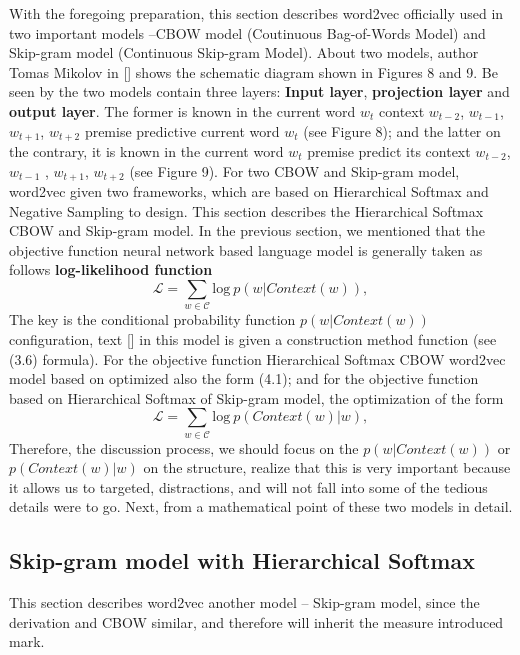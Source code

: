 With the foregoing preparation, this section describes word2vec officially used in two important models --CBOW model (Coutinuous Bag-of-Words Model) and Skip-gram model (Continuous Skip-gram Model). About two models, author Tomas Mikolov in [] shows the schematic diagram shown in Figures 8 and 9.
Be seen by the two models contain three layers: \textbf{Input layer}, \textbf{projection layer}  and \textbf{output layer}. The former is known in the current word $w_t$ context $w_{t-2}$, $w_{t-1}$, $w_{t+1}$, $w_{t+2}$ premise predictive current word $w_t$ (see Figure 8); and the latter on the contrary, it is known in the current word $w_t$ premise predict its context $w_{t-2}$, $w_{t-1}$ , $w_{t+1}$, $w_{t+2}$ (see Figure 9).
For two CBOW and Skip-gram model, word2vec given two frameworks, which are based on Hierarchical Softmax and Negative Sampling to design. This section describes the Hierarchical Softmax CBOW and Skip-gram model.
In the previous section, we mentioned that the objective function neural network based language model is generally taken as follows \textbf{log-likelihood function}
$$\mathcal{L}=\sum_{w\in\mathcal{C}}\mathrm{log}\ p(w|Context(w)), $$
The key is the conditional probability function $p(w|Context(w))$ configuration, text [] in this model is given a construction method function (see (3.6) formula).
For the objective function Hierarchical Softmax CBOW word2vec model based on optimized also the form (4.1); and for the objective function based on Hierarchical Softmax of Skip-gram model, the optimization of the form
$$\mathcal{L}=\sum_{w\in\mathcal{C}}\mathrm{log}\ p(Context(w)|w), $$
Therefore, the discussion process, we should focus on the $p(w|Context(w))$ or $p(Context(w)|w)$ on the structure, realize that this is very important because it allows us to targeted, distractions, and will not fall into some of the tedious details were to go. Next, from a mathematical point of these two models in detail.

\subsection{Skip-gram model with Hierarchical Softmax}
This section describes word2vec another model -- Skip-gram model, since the derivation and CBOW similar, and therefore will inherit the measure introduced mark.
